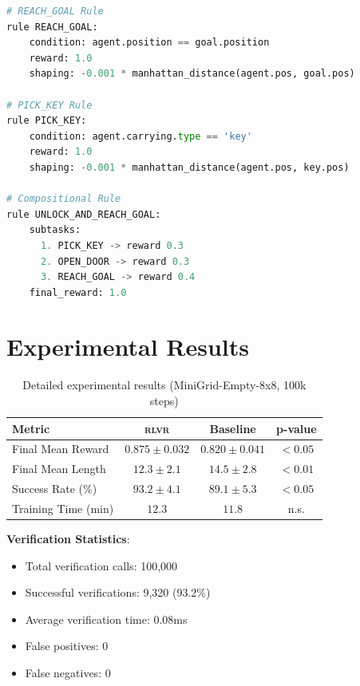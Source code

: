 \documentclass[11pt,a4paper]{article}
\newcommand{\rlvr}{\textsc{rlvr}}
\begin{document}
\begin{lstlisting}[caption={Verification rule specification DSL}, language=Python]
# REACH_GOAL Rule
rule REACH_GOAL:
    condition: agent.position == goal.position
    reward: 1.0
    shaping: -0.001 * manhattan_distance(agent.pos, goal.pos)

# PICK_KEY Rule
rule PICK_KEY:
    condition: agent.carrying.type == 'key'
    reward: 1.0
    shaping: -0.001 * manhattan_distance(agent.pos, key.pos)

# Compositional Rule
rule UNLOCK_AND_REACH_GOAL:
    subtasks:
      1. PICK_KEY -> reward 0.3
      2. OPEN_DOOR -> reward 0.3
      3. REACH_GOAL -> reward 0.4
    final_reward: 1.0
\end{lstlisting}

\section{Experimental Results}
\label{app:results}

\begin{table}[h]
\centering
\caption{Detailed experimental results (MiniGrid-Empty-8x8, 100k steps)}
\small
\begin{tabular}{@{}lccc@{}}
\toprule
\textbf{Metric} & \textbf{\rlvr{}} & \textbf{Baseline} & \textbf{p-value} \\
\midrule
Final Mean Reward & $0.875 \pm 0.032$ & $0.820 \pm 0.041$ & $< 0.05$ \\
Final Mean Length & $12.3 \pm 2.1$ & $14.5 \pm 2.8$ & $< 0.01$ \\
Success Rate (\%) & $93.2 \pm 4.1$ & $89.1 \pm 5.3$ & $< 0.05$ \\
Training Time (min) & $12.3$ & $11.8$ & n.s. \\
\bottomrule
\end{tabular}
\end{table}

\textbf{Verification Statistics}:
\begin{itemize}[leftmargin=*]
    \item Total verification calls: 100,000
    \item Successful verifications: 9,320 (93.2\%)
    \item Average verification time: 0.08ms
    \item False positives: 0
    \item False negatives: 0
\end{itemize}
\end{document}
